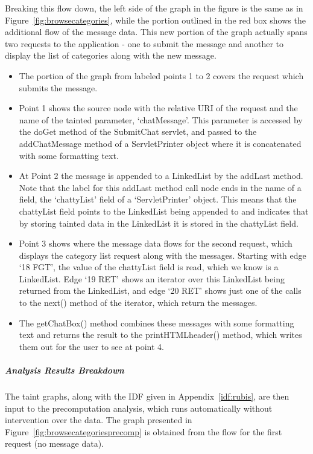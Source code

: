 \documentclass[msc,oneside]{ubcthesis}
\begin{document}
Breaking this flow down, the left side of the graph in the figure is the same as in Figure~\ref{fig:browsecategories}, while the portion outlined in the red box shows the additional flow of the message data. This new portion of the graph actually spans two requests to the application - one to submit the  message and another to display the list of categories along with the new message.

\begin{itemize}
\item The portion of the graph from labeled points 1 to 2 covers the request which submits the message. 
\item Point 1 shows the source node with the relative URI of the request and the name of the tainted parameter, `chatMessage'. This parameter is accessed by the doGet method of the SubmitChat servlet, and passed to the addChatMessage method of a ServletPrinter object where it is concatenated with some formatting text.
\item At Point 2 the message is appended to a LinkedList by the addLast method. Note that the label for this addLast method call node ends in the name of a field, the `chattyList' field of a `ServletPrinter' object. This means that the chattyList field points to the LinkedList being appended to and indicates that by storing tainted data in the LinkedList it is stored in the chattyList field.
\item Point 3 shows where the message data flows for the second request, which displays the category list request along with the messages. Starting with edge `18 FGT', the value of the chattyList field is read, which we know is a LinkedList. Edge `19 RET' shows an iterator over this LinkedList being returned from the LinkedList, and edge `20 RET' shows just one of the calls to the next() method of the iterator, which return the messages.
\item The getChatBox() method combines these messages with some formatting text and returns the result to the printHTMLheader() method, which writes them out for the user to see at point 4.
\end{itemize}
 
\subparagraph{Analysis Results Breakdown}
The taint graphs, along with the IDF given in Appendix~\ref{idf:rubis}, are then input to the precomputation analysis, which runs automatically without intervention over the data. The graph presented in Figure~\ref{fig:browsecategoriesprecomp} is obtained from the flow for the first request (no message data). \\
\end{document}

